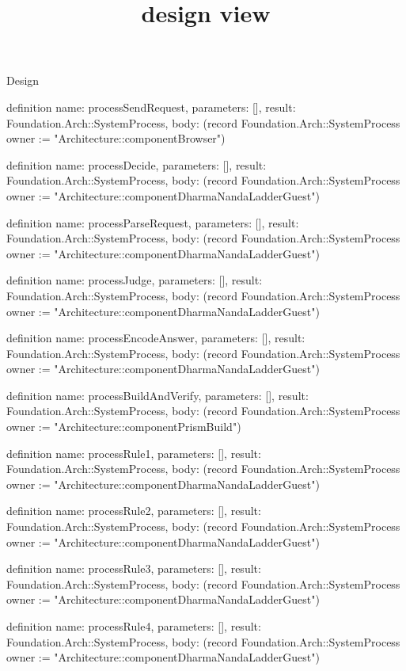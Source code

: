 \begin{lexlean}{Design}
\title{design view}
\begin{semanticmodule}
definition{
  name: processSendRequest,
  parameters: [],
  result: Foundation.Arch::SystemProcess,
  body: (record Foundation.Arch::SystemProcess {owner := "Architecture::componentBrowser"})
}

definition{
  name: processDecide,
  parameters: [],
  result: Foundation.Arch::SystemProcess,
  body: (record Foundation.Arch::SystemProcess {owner := "Architecture::componentDharmaNandaLadderGuest"})
}

definition{
  name: processParseRequest,
  parameters: [],
  result: Foundation.Arch::SystemProcess,
  body: (record Foundation.Arch::SystemProcess {owner := "Architecture::componentDharmaNandaLadderGuest"})
}

definition{
  name: processJudge,
  parameters: [],
  result: Foundation.Arch::SystemProcess,
  body: (record Foundation.Arch::SystemProcess {owner := "Architecture::componentDharmaNandaLadderGuest"})
}

definition{
  name: processEncodeAnswer,
  parameters: [],
  result: Foundation.Arch::SystemProcess,
  body: (record Foundation.Arch::SystemProcess {owner := "Architecture::componentDharmaNandaLadderGuest"})
}

definition{
  name: processBuildAndVerify,
  parameters: [],
  result: Foundation.Arch::SystemProcess,
  body: (record Foundation.Arch::SystemProcess {owner := "Architecture::componentPrismBuild"})
}

definition{
  name: processRule1,
  parameters: [],
  result: Foundation.Arch::SystemProcess,
  body: (record Foundation.Arch::SystemProcess {owner := "Architecture::componentDharmaNandaLadderGuest"})
}

definition{
  name: processRule2,
  parameters: [],
  result: Foundation.Arch::SystemProcess,
  body: (record Foundation.Arch::SystemProcess {owner := "Architecture::componentDharmaNandaLadderGuest"})
}

definition{
  name: processRule3,
  parameters: [],
  result: Foundation.Arch::SystemProcess,
  body: (record Foundation.Arch::SystemProcess {owner := "Architecture::componentDharmaNandaLadderGuest"})
}

definition{
  name: processRule4,
  parameters: [],
  result: Foundation.Arch::SystemProcess,
  body: (record Foundation.Arch::SystemProcess {owner := "Architecture::componentDharmaNandaLadderGuest"})
}


\end{semanticmodule}
\end{lexlean}
